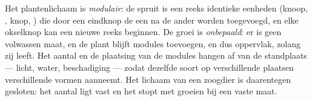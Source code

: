 \begin{proposition}\label{prop:b1:flowering-plant-organization:modular}
Het plantenlichaam is \emph{modulair}: de spruit is een
reeks identieke eenheden (knoop, , knop, ) die door een eindknop
de een na de ander worden toegevoegd, en elke okselknop kan een nieuwe reeks
beginnen. De groei is \emph{onbepaald}: er is geen
volwassen maat, en de plant blijft modules toevoegen, en dus oppervlak, zolang
zij leeft. Het aantal en de plaatsing van de modules hangen af van de
standplaats --- licht, water, beschadiging --- zodat dezelfde soort op
verschillende plaatsen verschillende vormen aanneemt. Het lichaam van een
zoogdier is daarentegen gesloten: het aantal  ligt vast en het stopt met
groeien bij een vaste maat.
\end{proposition}

